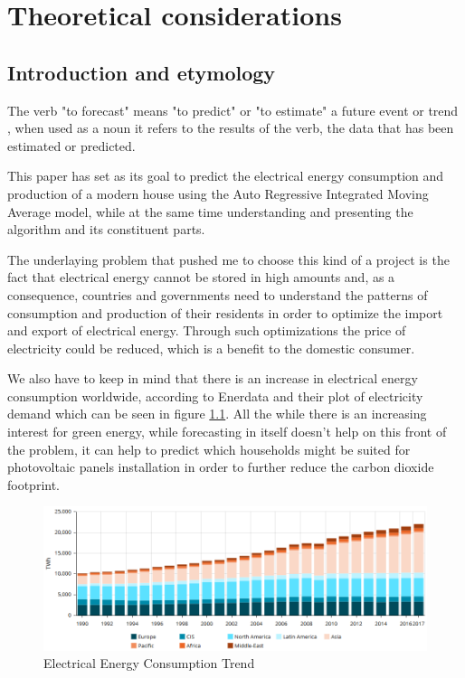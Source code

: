 \documentclass[12pt,a4paper,titlepage]{report}
\begin{document}
\newpage
\chapter{Theoretical considerations}
\section{Introduction and etymology}

The verb "to forecast" means "to predict" or "to estimate" a future event or trend \cite{oxfordForecast}, when used as a noun it refers to the results of the verb, the data that has been estimated or predicted.

This paper has set as its goal to predict the electrical energy consumption and production of a modern house using the Auto Regressive Integrated Moving Average model, while at the same time understanding and presenting the algorithm and its constituent parts.

The underlaying problem that pushed me to choose this kind of a project is the fact that electrical energy cannot be stored in high amounts and, as a consequence, countries and governments need to understand the patterns of consumption and production of their residents in order to optimize the import and export of electrical energy. Through such optimizations the price of electricity could be reduced, which is a benefit to the domestic consumer.

We also have to keep in mind that there is an increase in electrical energy consumption worldwide, according to Enerdata \cite{enerdata} and their plot of electricity demand which can be seen in figure \ref{energytrend}. All the while there is an increasing interest for green energy, while forecasting in itself doesn't help on this front of the problem, it can help to predict which households might be suited for photovoltaic panels installation in order to further reduce the carbon dioxide footprint. 

\begin{figure}[h]
    \centering
    \includegraphics[width=1\textwidth]{denergytrend}
    \caption{Electrical Energy Consumption Trend}
    \label{energytrend}
\end{figure}
\end{document}
